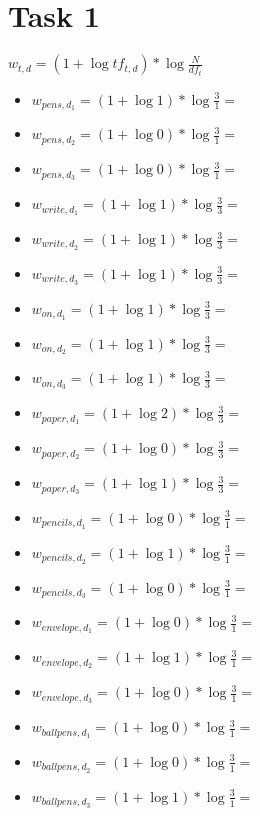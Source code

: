 \documentclass[a4paper]{scrartcl}
\begin{document}
    
\section{Task 1}
\begin{center}
    $w_{t,d}=(1+\log tf_{t,d})*\log \frac{N}{df_t}$
\end{center}
\begin{itemize}
    \item $w_{pens, d_1} = (1+\log 1) * \log \frac{3}{1} =$
    \item $w_{pens, d_2} = (1+\log 0) * \log \frac{3}{1} =$
    \item $w_{pens, d_3} = (1+\log 0) * \log \frac{3}{1} =$
    \item $w_{write, d_1} = (1+\log 1) * \log \frac{3}{3} =$
    \item $w_{write, d_2} = (1+\log 1) * \log \frac{3}{3} =$
    \item $w_{write, d_3} = (1+\log 1) * \log \frac{3}{3} =$
    \item $w_{on, d_1} = (1+\log 1) * \log \frac{3}{3} =$
    \item $w_{on, d_2} = (1+\log 1) * \log \frac{3}{3} =$
    \item $w_{on, d_3} = (1+\log 1) * \log \frac{3}{3} =$
    \item $w_{paper, d_1} = (1+\log 2) * \log \frac{3}{3} =$
    \item $w_{paper, d_2} = (1+\log 0) * \log \frac{3}{3} =$
    \item $w_{paper, d_3} = (1+\log 1) * \log \frac{3}{3} =$
    \item $w_{pencils, d_1} = (1+\log 0) * \log \frac{3}{1} =$
    \item $w_{pencils, d_2} = (1+\log 1) * \log \frac{3}{1} =$
    \item $w_{pencils, d_3} = (1+\log 0) * \log \frac{3}{1} =$
    \item $w_{envelope, d_1} = (1+\log 0) * \log \frac{3}{1} =$
    \item $w_{envelope, d_2} = (1+\log 1) * \log \frac{3}{1} =$
    \item $w_{envelope, d_3} = (1+\log 0) * \log \frac{3}{1} =$
    \item $w_{ballpens, d_1} = (1+\log 0) * \log \frac{3}{1} =$
    \item $w_{ballpens, d_2} = (1+\log 0) * \log \frac{3}{1} =$
    \item $w_{ballpens, d_3} = (1+\log 1) * \log \frac{3}{1} =$
\end{itemize}
\end{document}
